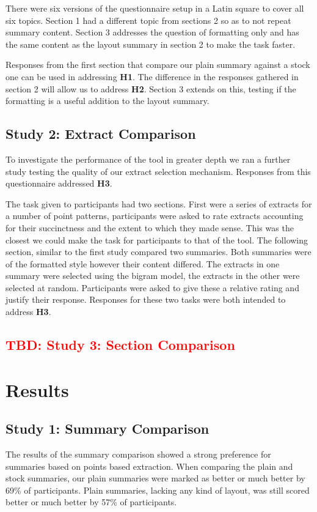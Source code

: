       There were six versions of the questionnaire setup in a Latin square to cover all six topics. Section 1 had a different topic from sections 2 so as to not repeat summary content. Section 3 addresses the question of formatting only and has the same content as the layout summary in section 2 to make the task faster.

      Responses from the first section that compare our plain summary against a stock one can be used in addressing \textbf{H1}. The difference in the responses gathered in section 2 will allow us to address \textbf{H2}. Section 3 extends on this, testing if the formatting is a useful addition to the layout summary.

    \tocless\subsection{Study 2: Extract Comparison}
      To investigate the performance of the tool in greater depth we ran a further study testing the quality of our extract selection mechanism. Responses from this questionnaire addressed \textbf{H3}.

      The task given to participants had two sections. First were a series of extracts for a number of point patterns, participants were asked to rate extracts accounting for their succinctness and the extent to which they made sense. This was the closest we could make the task for participants to that of the tool. The following section, similar to the first study compared two summaries. Both summaries were of the formatted style however their content differed. The extracts in one summary were selected using the bigram model, the extracts in the other were selected at random. Participants were asked to give these a relative rating and justify their response. Responses for these two tasks were both intended to address \textbf{H3}.

    \tocless\subsection{\textcolor{red}{TBD: Study 3: Section Comparison}}

  \section{Results}
    \tocless\subsection{Study 1: Summary Comparison}
      The results of the summary comparison showed a strong preference for summaries based on points based extraction. When comparing the plain and stock summaries, our plain summaries were marked as better or much better by 69\% of participants. Plain summaries, lacking any kind of layout, was still scored better or much better by 57\% of participants.


